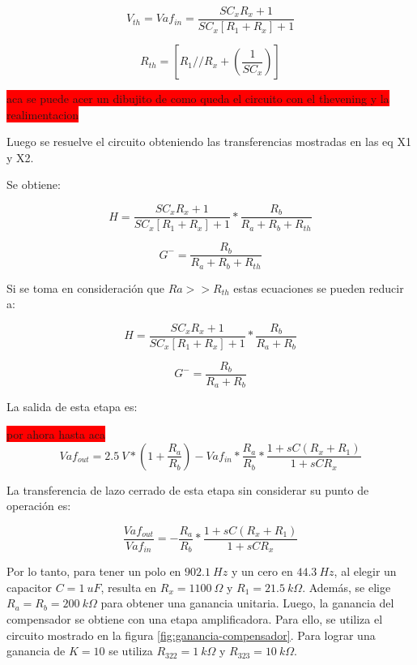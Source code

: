 \begin{equation} 
	V_{th} = Vaf_{in}= \frac{SC_xR_x+1}{SC_x[R_1+R_x]+1}
\end{equation}

\begin{equation} 
	R_{th} = [R_1 // R_x+(\frac{1}{SC_x})]
\end{equation}

\colorbox{red}{aca se puede acer un dibujito de como queda el circuito con el thevening y la realimentacion}

Luego se resuelve el circuito obteniendo las transferencias mostradas en las eq X1 y X2.

Se obtiene:

\begin{equation} 
	H = \frac{SC_xR_x+1}{SC_x[R_1+R_x]+1} * \frac{R_b}{R_a + R_b + R_{th}}
\end{equation}

\begin{equation} 
	G^- = \frac{R_b}{R_a + R_b + R_{th}}
\end{equation}

Si se toma en consideración que $Ra>>R_{th}$ estas ecuaciones se pueden reducir a: 

\begin{equation} 
	H = \frac{SC_xR_x+1}{SC_x[R_1+R_x]+1} * \frac{R_b}{R_a + R_b}
\end{equation}

\begin{equation} 
	G^- = \frac{R_b}{R_a + R_b}
\end{equation} 
  
La salida de esta etapa es:

\colorbox{red}{por ahora hasta aca}
\begin{equation} 
	Vaf_{out}= 2.5\:V* (1+\frac{R_a}{R_b})- Vaf_{in}*\frac{R_a}{R_b}*\frac{1+sC(R_x+R_1)}{1+sCR_x}
\end{equation}

La transferencia de lazo cerrado de esta etapa sin considerar su punto de operación es:

\begin{equation} 
	\frac{Vaf_{out}}{Vaf_{in}}= - \frac{R_a}{R_b}*\frac{1+sC(R_x+R_1)}{1+sCR_x}
\end{equation}

\noindent Por lo tanto, para tener un polo en $902.1\:Hz$ y un cero en $44.3\:Hz$, al elegir un capacitor $C = 1\:uF$, resulta en $R_x = 1100\:\Omega$ y $R_1 = 21.5\:k\Omega$. Además, se elige $R_a = R_b = 200\:k\Omega$ para obtener una ganancia unitaria. Luego, la ganancia del compensador se obtiene con una etapa amplificadora.
Para ello, se utiliza el circuito mostrado en la figura \ref{fig:ganancia-compensador}. Para lograr una ganancia de $K=10$ se utiliza $R_{322} = 1\:k\Omega$ y $R_{323} = 10\:k\Omega$.



